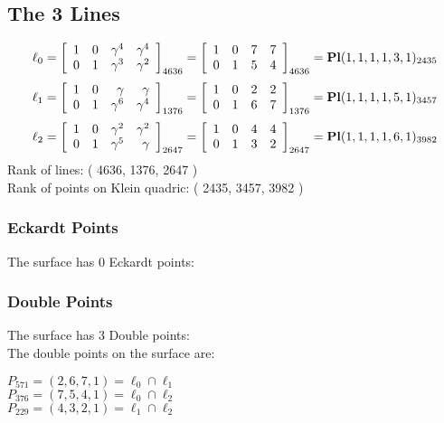 \documentclass{article}
\begin{document}
{\subsection*{The 3 Lines}
$$
\ell_{0} = 
\left[
\begin{array}{*{4}{r}}
1 & 0 & \gamma^{4} & \gamma^{4}\\
0 & 1 & \gamma^{3} & \gamma^{2}\\
\end{array}
\right]
_{4636}
=
\left[
\begin{array}{*{4}c}
1  & 0  & 7  & 7\\
0  & 1  & 5  & 4\\
\end{array}
\right]_{4636}
={\rm\bf Pl}(1,1,1,1,3,1 )_{2435}$$
$$
\ell_{1} = 
\left[
\begin{array}{*{4}{r}}
1 & 0 & \gamma  & \gamma \\
0 & 1 & \gamma^{6} & \gamma^{4}\\
\end{array}
\right]
_{1376}
=
\left[
\begin{array}{*{4}c}
1  & 0  & 2  & 2\\
0  & 1  & 6  & 7\\
\end{array}
\right]_{1376}
={\rm\bf Pl}(1,1,1,1,5,1 )_{3457}$$
$$
\ell_{2} = 
\left[
\begin{array}{*{4}{r}}
1 & 0 & \gamma^{2} & \gamma^{2}\\
0 & 1 & \gamma^{5} & \gamma \\
\end{array}
\right]
_{2647}
=
\left[
\begin{array}{*{4}c}
1  & 0  & 4  & 4\\
0  & 1  & 3  & 2\\
\end{array}
\right]_{2647}
={\rm\bf Pl}(1,1,1,1,6,1 )_{3982}$$
Rank of lines: ( 4636, 1376, 2647 )\\
Rank of points on Klein quadric: ( 2435, 3457, 3982 )\\
\subsubsection*{Eckardt Points}
The surface has 0 Eckardt points:\\
\subsubsection*{Double Points}
The surface has 3 Double points:\\
The double points on the surface are:\\
\begin{multicols}{2}
\noindent
$P_{571} = ( 2, 6, 7, 1 ) = \ell_{0} \cap \ell_{1} $\\
$P_{376} = ( 7, 5, 4, 1 ) = \ell_{0} \cap \ell_{2} $\\
$P_{229} = ( 4, 3, 2, 1 ) = \ell_{1} \cap \ell_{2} $\\
\end{multicols}
}
\end{document}
